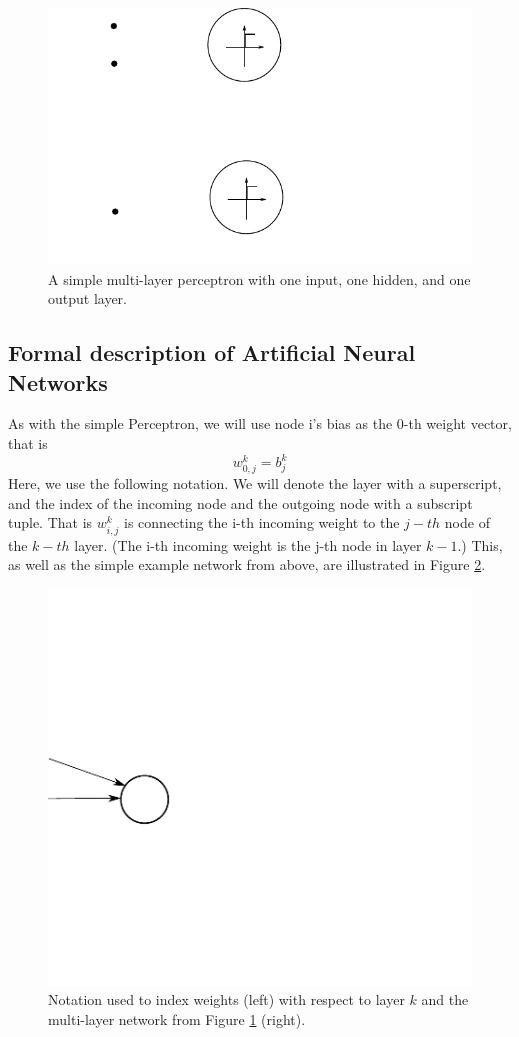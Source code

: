 \documentclass[paper=6.14in:9.21in,pagesize=pdftex,11pt,twoside,openright]{scrbook}
\begin{document}
\begin{figure}
\centering
\includegraphics[width=0.8\columnwidth]{figs/basicmultilayernetwork}
\caption{A simple multi-layer perceptron with one input, one hidden, and one output layer. \label{fig:basicmultilayer}}
\end{figure}

\subsection{Formal description of Artificial Neural Networks}
As with the simple Perceptron, we will use node i's bias as the 0-th weight vector, that is 
\begin{equation}
w^k_{0,j}=b^k_j
\end{equation}
Here, we use the following notation. We will denote the layer with a superscript, and the index of the incoming node and the outgoing node with a subscript tuple. That is $w^k_{i,j}$ is connecting the i-th incoming weight to the $j-th$ node of the $k-th$ layer. (The i-th incoming weight is the j-th node in layer $k-1$.) This, as well as the simple example network from above, are illustrated in Figure \ref{fig:backpropnotation}. 

\begin{figure}[!htb]
\centering
\includegraphics[width=0.7\columnwidth]{figs/backpropnotation}
\caption{Notation used to index weights (left) with respect to layer $k$ and the multi-layer network from Figure \ref{fig:basicmultilayer} (right).\label{fig:backpropnotation}}
\end{figure}
\end{document}
